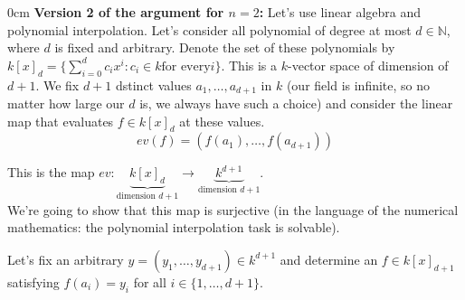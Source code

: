 \clearpage
  \begin{theorem}[title =Theorem 1.1.8 (Continued)]
    \begin{addmargin}[0.6cm]{0cm}  
    \textbf{Version 2 of the argument for $n = 2$:} \hspace*{0.2cm} Let's use linear algebra and polynomial interpolation. Let's consider all polynomial of degree at most $d \in \mathbb{N}$, 
    where $d$ is fixed and arbitrary. Denote the set of these polynomials by $k[x]_d = \{\sum_{i = 0}^{d} c_i x^i: c_i \in k \text{for every} i\}$. 
    This is a $k$-vector space of dimension of $d + 1$.  
    We fix $d + 1$ dstinct values $a_1, \ldots, a_{d+1}$ in $k$ (our field is infinite, so no matter how large our $d$ is, we always have  such a choice) 
    and consider the linear map that evaluates $f \in k[x]_d$ at these values. 
    \[ev(f) = (f(a_1), \ldots, f(a_{d+1}))\] 

    \begin{minipage}{0.49\textwidth}
    This is the map $ev: \underbrace{k[x]_d}_{\text{dimension } d+1} \to \underbrace{k^{d + 1}}_{\text{dimension } d+1}$.  \\
    
    We're going to show that this map is surjective (in the language of the numerical mathematics: the polynomial interpolation task is solvable).  
    \end{minipage}
\hspace*{0.2cm}
    \begin{minipage}{0.49\textwidth}
  \end{minipage}

  Let's fix an arbitrary $y = (y_1, \ldots, y_{d+1}) \in k^{d + 1}$ and determine an $f \in k[x]_{d+1}$ satisfying $f(a_i) = y_i$ for all $i \in \{1, \ldots, d+1\}$.   


\end{addmargin}
\end{theorem}

